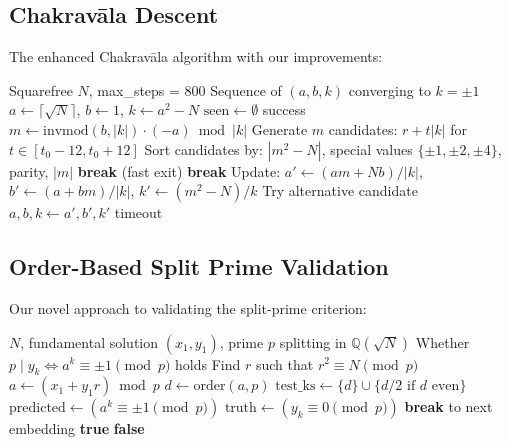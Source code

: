 \documentclass[12pt]{article}
\begin{document}
\subsection{Chakravāla Descent}

The enhanced Chakravāla algorithm with our improvements:

\begin{algorithm}
\caption{Enhanced Chakravāla Descent}
\begin{algorithmic}[1]
\Require Squarefree $N$, max\_steps = 800
\Ensure Sequence of $(a, b, k)$ converging to $k = \pm 1$
\State $a \gets \lceil \sqrt{N} \rceil$, $b \gets 1$, $k \gets a^2 - N$
\State $\text{seen} \gets \emptyset$
 \Return success \EndIf
\State $m \gets \text{invmod}(b, |k|) \cdot (-a) \bmod |k|$
\State Generate $m$ candidates: $r + t|k|$ for $t \in [t_0-12, t_0+12]$
\State Sort candidates by: $|m^2-N|$, special values $\{\pm1,\pm2,\pm4\}$, parity, $|m|$
 \State \textbf{break} (fast exit) \EndIf
{} \State \textbf{break} \EndIf
\EndFor
\State Update: $a' \gets (am + Nb)/|k|$, $b' \gets (a + bm)/|k|$, $k' \gets (m^2-N)/k$
 \State Try alternative candidate \EndIf
\State $a, b, k \gets a', b', k'$
\EndFor
\State \Return timeout
\end{algorithmic}
\end{algorithm}

\subsection{Order-Based Split Prime Validation}

Our novel approach to validating the split-prime criterion:

\begin{algorithm}
\caption{Order-Based Split Prime Validation}
\begin{algorithmic}[1]
\Require $N$, fundamental solution $(x_1, y_1)$, prime $p$ splitting in $\mathbb{Q}(\sqrt{N})$
\Ensure Whether $p \mid y_k \iff a^k \equiv \pm 1 \pmod{p}$ holds
\State Find $r$ such that $r^2 \equiv N \pmod{p}$
\State $a \gets (x_1 + y_1 r) \bmod p$
\State $d \gets \text{order}(a, p)$ 
\State $\text{test\_ks} \gets \{d\} \cup \{d/2 \text{ if $d$ even}\}$
\State $\text{predicted} \gets (a^k \equiv \pm 1 \pmod{p})$
\State $\text{truth} \gets (y_k \equiv 0 \pmod{p})$ 
 \State \textbf{break} to next embedding \EndIf
\EndFor
{} \Return \textbf{true} \EndIf
\EndFor
\State \Return \textbf{false}
\end{algorithmic}
\end{algorithm}
\end{document}
